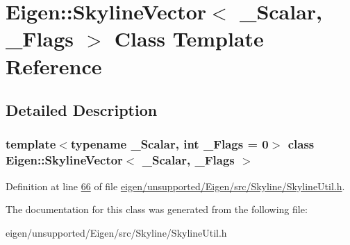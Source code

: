 \hypertarget{class_eigen_1_1_skyline_vector}{}\section{Eigen\+:\+:Skyline\+Vector$<$ \+\_\+\+Scalar, \+\_\+\+Flags $>$ Class Template Reference}
\label{class_eigen_1_1_skyline_vector}


\subsection{Detailed Description}
\subsubsection*{template$<$typename \+\_\+\+Scalar, int \+\_\+\+Flags = 0$>$\newline
class Eigen\+::\+Skyline\+Vector$<$ \+\_\+\+Scalar, \+\_\+\+Flags $>$}



Definition at line \hyperlink{eigen_2unsupported_2_eigen_2src_2_skyline_2_skyline_util_8h_source_l00066}{66} of file \hyperlink{eigen_2unsupported_2_eigen_2src_2_skyline_2_skyline_util_8h_source}{eigen/unsupported/\+Eigen/src/\+Skyline/\+Skyline\+Util.\+h}.



The documentation for this class was generated from the following file\+:\begin{DoxyCompactItemize}
\item 
eigen/unsupported/\+Eigen/src/\+Skyline/\+Skyline\+Util.\+h\end{DoxyCompactItemize}
